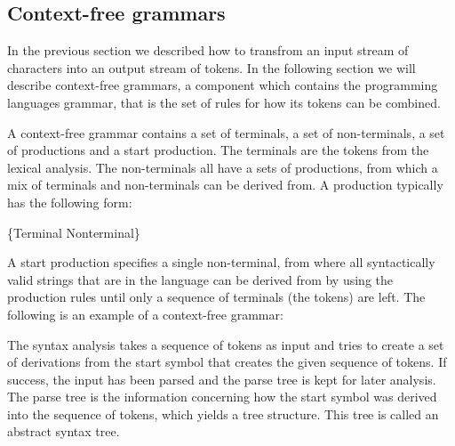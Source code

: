 \subsection{Context-free grammars}
\label{sec:context-freegrammars}
In the previous section we described how to transfrom an input stream of
characters into an output stream of tokens. In the following section we
will describe context-free grammars, a component which contains the programming
languages grammar, that is the set of rules for how its tokens can be
combined.

A context-free grammar contains a set of terminals, a set of non-terminals, a
set of productions and a start production. The terminals are the tokens from the
lexical analysis. The non-terminals all have a sets of productions, from which a
mix of terminals and non-terminals can be derived from. A production typically
has the following form:

\begin{ebnf}
 {\{Terminal \gor \gcat Nonterminal\}}
\end{ebnf}

A start production specifies a single non-terminal, from where all syntactically
valid strings that are in the language can be derived from by using the
production rules until only a sequence of terminals (the tokens) are left. The
following is an example of a context-free grammar: 

\begin{ebnf}
\galt{\gter{>}}
\galt{\gter{<}}
\end{ebnf}

The syntax analysis takes a sequence of tokens as input and tries to create a
set of derivations from the start symbol that creates the given sequence of
tokens. If success, the input has been parsed and the parse tree is kept for
later analysis. The parse tree is the information concerning how the start
symbol was derived into the sequence of tokens, which yields a tree structure.
This tree is called an abstract syntax tree.

